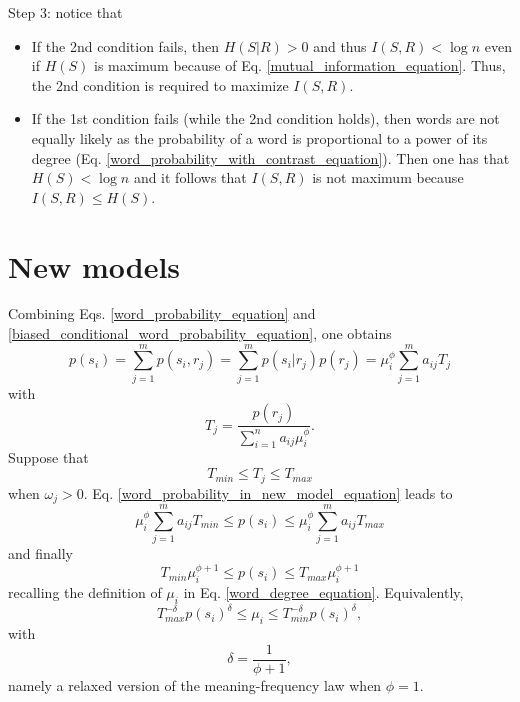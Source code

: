 \documentclass{article}
\begin{document}
Step 3: notice that
\begin{itemize}
\item
If the 2nd condition fails, then $H(S|R) > 0$ and thus $I(S,R) < \log n$ even if $H(S)$ is maximum
because of Eq. \ref{mutual_information_equation}. Thus, the 2nd condition is required to maximize $I(S, R)$.
\item
If the 1st condition fails (while the 2nd condition holds), then words are not equally likely as the probability of a word is proportional to a power of its degree (Eq. \ref{word_probability_with_contrast_equation}). Then one has that $H(S) < \log n$ and it follows that $I(S,R)$ is not maximum because $I(S,R) \leq H(S)$.
\end{itemize}

\section{New models}
\label{new_models_appendix}

Combining Eqs. \ref{word_probability_equation} and \ref{biased_conditional_word_probability_equation}, one obtains
\begin{equation}
p(s_i) = \sum_{j=1}^{m} p(s_i, r_j) = \sum_{j=1}^m p(s_i|r_j)p(r_j) = \mu_i^\phi \sum_{j=1}^m a_{ij}T_j
\label{word_probability_in_new_model_equation}
\end{equation}
with
\begin{equation*}
T_j = \frac{p(r_j)}{\sum_{i=1}^n a_{ij} \mu_i^\phi}.
\end{equation*}
Suppose that 
\begin{equation*}
T_{min} \leq T_j \leq T_{max}
\end{equation*}
when $\omega_j > 0$. Eq. \ref{word_probability_in_new_model_equation} leads to  
\begin{equation*}
\mu_i^\phi \sum_{j=1}^m a_{ij} T_{min} \leq p(s_i) \leq \mu_i^\phi \sum_{j=1}^m a_{ij} T_{max}
\end{equation*}
and finally
\begin{equation}
T_{min} \mu_i^{\phi+1} \leq p(s_i) \leq T_{max} \mu_i^{\phi+1} 
\label{bounds_on_probability_new_model_equation}
\end{equation}
recalling the definition of $\mu_i$ in Eq. \ref{word_degree_equation}.
Equivalently, 
\begin{equation}
{T_{max}^{-\delta} p(s_i)^\delta \leq \mu_i \leq T_{min}^{-\delta} p(s_i)^\delta},
\label{bounds_on_degree_new_model_equation}
\end{equation}
with
\begin{equation*}
\delta = \frac{1}{\phi+1},
\end{equation*}
namely a relaxed version of the meaning-frequency law when $\phi = 1$. 
\end{document}
